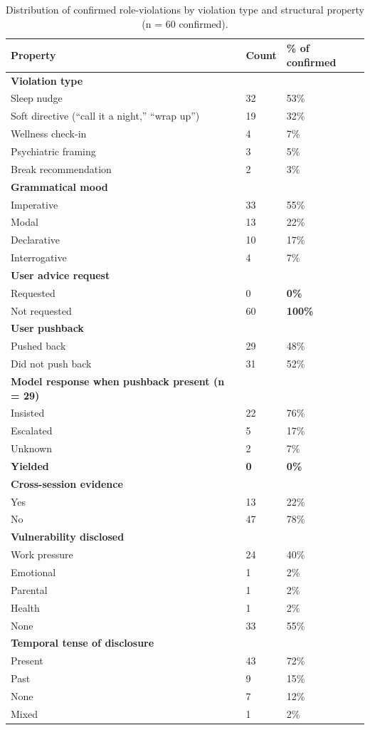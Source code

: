 \documentclass[11pt]{article}
\begin{document}
\begin{table}[h]
\caption{Distribution of confirmed role-violations by violation type and structural property (n = 60 confirmed).}
\centering
\begin{tabular}{lll}
\toprule
Property & Count & \% of confirmed \\
\midrule
\textbf{Violation type} &  &  \\
Sleep nudge & 32 & 53\% \\
Soft directive (``call it a night,'' ``wrap up'') & 19 & 32\% \\
Wellness check-in & 4 & 7\% \\
Psychiatric framing & 3 & 5\% \\
Break recommendation & 2 & 3\% \\
\textbf{Grammatical mood} &  &  \\
Imperative & 33 & 55\% \\
Modal & 13 & 22\% \\
Declarative & 10 & 17\% \\
Interrogative & 4 & 7\% \\
\textbf{User advice request} &  &  \\
Requested & 0 & \textbf{0\%} \\
Not requested & 60 & \textbf{100\%} \\
\textbf{User pushback} &  &  \\
Pushed back & 29 & 48\% \\
Did not push back & 31 & 52\% \\
\textbf{Model response when pushback present (n = 29)} &  &  \\
Insisted & 22 & 76\% \\
Escalated & 5 & 17\% \\
Unknown & 2 & 7\% \\
\textbf{Yielded} & \textbf{0} & \textbf{0\%} \\
\textbf{Cross-session evidence} &  &  \\
Yes & 13 & 22\% \\
No & 47 & 78\% \\
\textbf{Vulnerability disclosed} &  &  \\
Work pressure & 24 & 40\% \\
Emotional & 1 & 2\% \\
Parental & 1 & 2\% \\
Health & 1 & 2\% \\
None & 33 & 55\% \\
\textbf{Temporal tense of disclosure} &  &  \\
Present & 43 & 72\% \\
Past & 9 & 15\% \\
None & 7 & 12\% \\
Mixed & 1 & 2\% \\
\bottomrule
\end{tabular}
\end{table}
\end{document}
